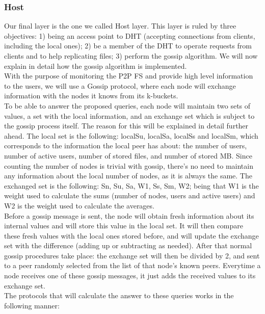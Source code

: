 \documentclass[times,9pt,article]{llncs}
\begin{document}
\subsubsection{Host}
Our final layer is the one we called Host layer. This layer is ruled by three objectives: 1) being an access point to DHT (accepting connections from clients, including the local ones); 2) be a member of the DHT to operate requests from clients and to help replicating files; 3) perform the gossip algorithm. We will now explain in detail how the gossip algorithm is implemented.\\
With the purpose of monitoring the P2P FS and provide high level information to the users,
we will use a Gossip protocol, where each node will exchange information with the nodes it knows from its k-buckets.\\
To be able to answer the proposed queries, each node will maintain two sets of values, a set with the local information, and an exchange set which is subject to the gossip process itself. The reason for this will be explained in detail further ahead. The local set is the following: localSu, localSa, localSs and localSm, which corresponds to the information the local peer has about: the number of users, number of active users, number of stored files, and number of stored MB. Since counting the number of nodes is trivial with gossip, there's no need to maintain any information about the local number of nodes, as it is always the same. The exchanged set is the following: Sn, Su, Sa, W1, Ss, Sm, W2; being that W1 is the weight used to calculate the sums (number of nodes, users and active users) and W2 is the weight used to calculate the averages.\\
Before a gossip message is sent, the node will obtain fresh information about its internal values and will store this value in the local set. It will then compare these fresh values with the local ones stored before, and will update the exchange set with the difference (adding up or subtracting as needed). After that normal gossip procedures take place: the exchange set will then be divided by 2, and sent to a peer randomly selected from the list of that node's known peers. Everytime a node receives one of these gossip messages, it just adds the received values to its exchange set.\\
The protocols that will calculate the answer to these queries works in the following manner:
\end{document}
